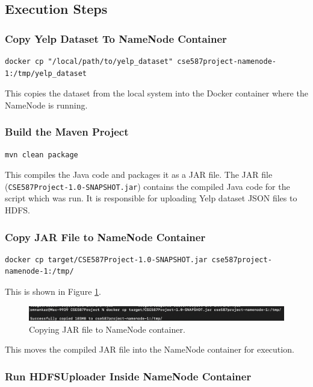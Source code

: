 \documentclass[conference]{IEEEtran}
\begin{document}
\subsection{Execution Steps}

\subsubsection{Copy Yelp Dataset To NameNode Container}

\begin{verbatim}
docker cp "/local/path/to/yelp_dataset" cse587project-namenode-1:/tmp/yelp_dataset
\end{verbatim}
This copies the dataset from the local system into the Docker container where the
NameNode is running.

\subsubsection{Build the Maven Project}

\begin{verbatim}
mvn clean package
\end{verbatim}
This compiles the Java code and packages it as a JAR file. The JAR file
(\texttt{CSE587Project-1.0-SNAPSHOT.jar}) contains the compiled Java code for
the script which was run. It is responsible for uploading Yelp dataset JSON
files to HDFS.

\subsubsection{Copy JAR File to NameNode Container}

\begin{verbatim}
docker cp target/CSE587Project-1.0-SNAPSHOT.jar cse587project-namenode-1:/tmp/
\end{verbatim}
This is shown in Figure \ref{fig:successfully_copied}.
\begin{figure}[htbp]
    \centerline{\includegraphics[width=1\textwidth]{graphics/successfully_copied.png}}
    \caption{Copying JAR file to NameNode container.}
    \label{fig:successfully_copied}
\end{figure}
This moves the compiled JAR file into the NameNode container for execution.

\subsubsection{Run HDFSUploader Inside NameNode Container}
\end{document}

